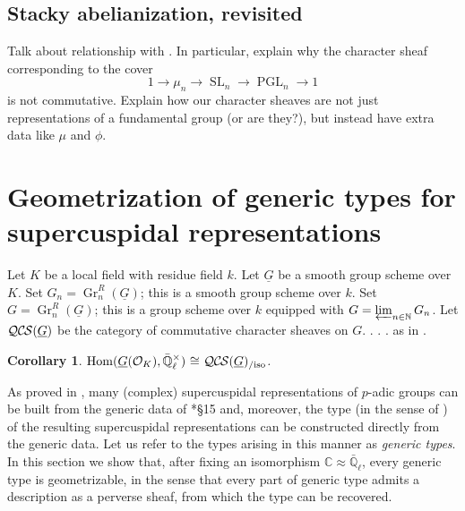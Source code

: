 \documentclass[10pt]{amsart}
\theoremstyle{plain}
\newtheorem{corollary}[theorem]{Corollary}
\theoremstyle{definition}
\newcommand{\NN}{{\mathbb{N}}}
\newcommand{\CC}{{\mathbb{C}}}
\newcommand{\EE}{\mathbb{\bar Q}_\ell}
\newcommand{\OK}{\mathcal{O}_K}
\newcommand{\Fq}{k}
\newcommand{\EEx}{\EE^\times}
\DeclareMathOperator{\Hom}{Hom}
\DeclareMathOperator{\Gr}{Gr}
\DeclareMathOperator{\SL}{SL}
\DeclareMathOperator{\PGL}{PGL}
\newcommand{\iso}{{\ \cong\ }}
\newcommand{\QCS}{{\mathcal{QC\hskip-0.8pt S}}}
\newcommand{\QCSiso}[1]{\QCS(#1)_{/\text{iso}}}
\begin{document}
\subsection{Stacky abelianization, revisited}
 
 Talk about relationship with \cite{kamgarpour:09a}.  In particular, explain why the character sheaf corresponding
 to the cover
 \[
 1 \to \mu_n \to \SL_n \to \PGL_n \to 1
 \]
 is not commutative.  Explain how our character sheaves are not just representations of a fundamental group
 (or are they?), but instead have extra data like $\mu$ and $\phi$.

\section{Geometrization of generic types for supercuspidal representations}


Let $K$ be a local field with residue field $\Fq$.
Let $\underline{G}$ be a smooth group scheme over $K$.
Set $G_n = \Gr^R_n(\underline{G})$; this is a smooth group scheme over $\Fq$.
Set $G = \Gr^R_n(\underline{G})$; this is a group scheme over $\Fq$ equipped with $G = \varprojlim_{n\in \NN} G_n$.
Let $\QCS(\underline{G})$ be the category of commutative character sheaves on $G$. . . .  as in \cite{cunningham-roe:13a}.

\begin{corollary}\label{cor:QCS}
$\Hom(\underline{G}(\OK),\EEx) \iso \QCSiso{\underline{G}}$.
\end{corollary}

 


As proved in \cite{kim:07a}, many (complex) supercuspidal representations of $p$-adic groups can be built from the generic data of \cite{yu:01a}*{\S 15} and, moreover, the type (in the sense of \cite{bushnell-kutzko:98a}) of the resulting supercuspidal representations can be constructed directly from the generic data. 
Let us refer to the types arising in this manner as {\it generic types}.
In this section we show that, after fixing an isomorphism $\CC \approx \EE$, every generic type is geometrizable, in the sense that every part of generic type admits a description as a perverse sheaf, from which the type can be recovered.
\end{document}
